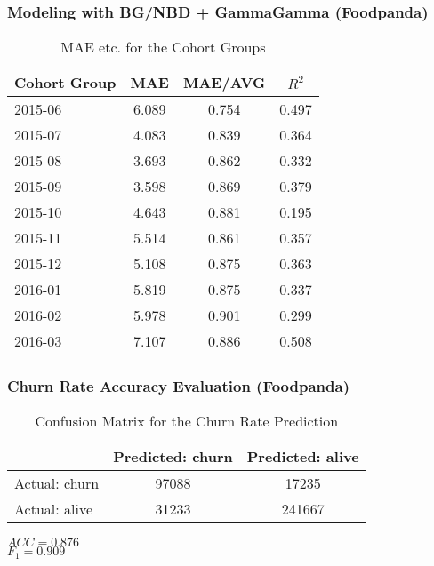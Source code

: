 \documentclass{beamer} %
\theoremstyle{definition} %
\begin{document}
\begin{frame}
\frametitle{Modeling with BG/NBD + GammaGamma (Foodpanda)}
\begin{center}
            \begin{table}
\begin{tabular}{l | c | c | c }
Cohort Group & MAE & MAE/AVG & $R^2$ \\
\hline \hline
2015-06 & 6.089 & 0.754 & 0.497\\ 
2015-07 & 4.083 & 0.839 & 0.364\\
2015-08 & 3.693 & 0.862 & 0.332\\
2015-09 & 3.598 & 0.869 & 0.379\\ 
2015-10 & 4.643 & 0.881 & 0.195\\ 
2015-11 & 5.514 & 0.861 & 0.357\\
2015-12 & 5.108 & 0.875 & 0.363\\
2016-01 & 5.819 & 0.875 & 0.337\\ 
2016-02 & 5.978 & 0.901 & 0.299\\ 
2016-03 & 7.107 & 0.886 & 0.508\\ 
\end{tabular}
\caption{MAE etc. for the Cohort Groups}
\end{table}
        \end{center}
\end{frame}

\begin{frame}
\frametitle{Churn Rate Accuracy Evaluation (Foodpanda)}
\begin{center}
            \begin{table}
\begin{tabular}{l | c | c }
 & Predicted: churn & Predicted: alive\\
\hline \hline
Actual: churn & 97088 & 17235\\ 
Actual: alive & 31233 & 241667
\end{tabular}
\caption{Confusion Matrix for the Churn Rate Prediction}
\end{table}
        \end{center}     
       
\begin{rmk}
	$ACC=0.876$ \\
    $F_1=0.909$ 
\end{rmk}
\end{frame}
\end{document}
